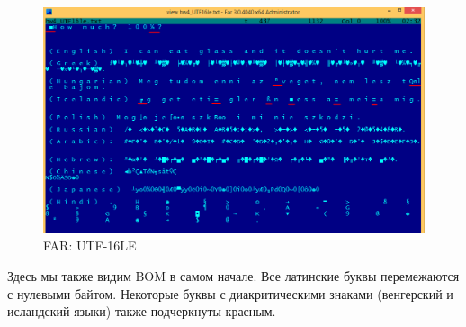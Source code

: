 \begin{figure}[H]
\centering
\includegraphics[scale=\FigScale]{digging_into_code/strings/multilang_sampler_UTF16.png}
\caption{FAR: UTF-16LE}
\end{figure}

Здесь мы также видим \ac{BOM} в самом начале.
Все латинские буквы перемежаются с нулевыми байтом.
Некоторые буквы с диакритическими знаками (венгерский и исландский языки) также подчеркнуты красным.




